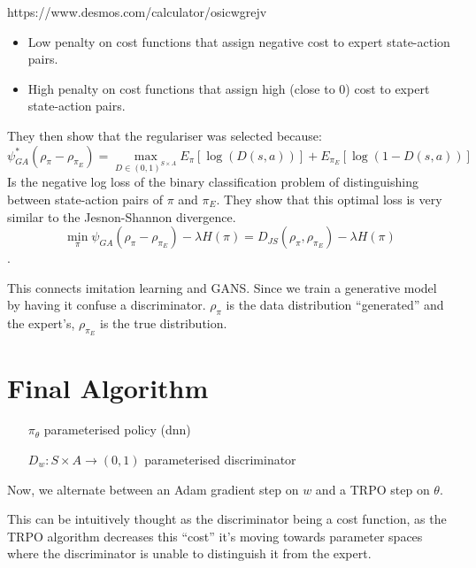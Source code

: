\documentclass{article}
\begin{document}
https://www.desmos.com/calculator/osicwgrejv

\begin{itemize}
\item Low penalty on cost functions that assign negative cost to expert state-action pairs.
\item High penalty on cost functions that assign high (close to 0) cost to expert state-action pairs.
\end{itemize}

They then show that the regulariser was selected because:
\[\psi^{*}_{GA}(\rho_{\pi}-\rho_{\pi_{E}}) = \max_{D \in (0,1)^{S \times A}} E_{\pi} [\log (D(s,a))] + E_{\pi_{E}} [\log (1 - D(s,a))]\]
Is the negative log loss of the binary classification problem of distinguishing between state-action pairs of \(\pi\) and \(\pi_{E}\).
They show that this optimal loss is very similar to the Jesnon-Shannon divergence.
\[\min_{\pi} \psi_{GA}(\rho_{\pi}-\rho_{\pi_{E}}) - \lambda H(\pi) = D_{JS}(\rho_{\pi},\rho_{\pi_{E}}) - \lambda H(\pi) \].

This connects imitation learning and GANS. Since we train a generative model by having it confuse a discriminator. \(\rho_{\pi}\) is the data distribution ``generated'' and the expert's, \(\rho_{\pi_{E}}\) is the true distribution.

\section{Final Algorithm}
\begin{itemize}

  \item[\(\pi_{\theta}\)] parameterised policy (dnn)
  \item[\(D_{w} : S \times A \to (0, 1)\)] parameterised discriminator

  \end{itemize}


Now, we alternate between an Adam gradient step on \(w\) and a TRPO step on \(\theta\).

This can be intuitively thought as the discriminator being a cost function, as the TRPO algorithm decreases this ``cost'' it's moving towards parameter spaces where the discriminator is unable to distinguish it from the expert.
\end{document}
